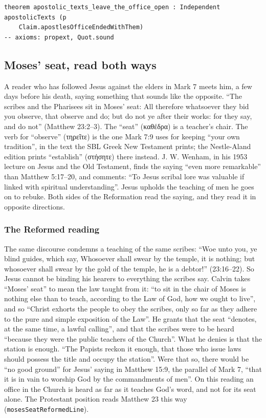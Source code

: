 \documentclass[11pt]{article}
\begin{document}
{\small\begin{verbatim}
theorem apostolic_texts_leave_the_office_open : Independent apostolicTexts (p
    Claim.apostlesOfficeEndedWithThem)
-- axioms: propext, Quot.sound
\end{verbatim}}
\subsection*{Moses’ seat, read both ways}
A reader who has followed Jesus against the elders in Mark 7 meets him, a few days before his death, saying something that sounds like the opposite. “The scribes and the Pharisees sit in Moses’ seat: All therefore whatsoever they bid you observe, that observe and do; but do not ye after their works: for they say, and do not” (Matthew 23:2–3). The “seat” (καθέδρα) is a teacher’s chair. The verb for “observe” (τηρεῖτε) is the one Mark 7:9 uses for keeping “your own tradition”, in the text the SBL Greek New Testament prints; the Nestle-Aland edition prints “establish” (στήσητε) there instead. J. W. Wenham, in his 1953 lecture on Jesus and the Old Testament, finds the saying “even more remarkable” than Matthew 5:17–20, and comments: “To Jesus scribal lore was valuable if linked with spiritual understanding”. Jesus upholds the teaching of men he goes on to rebuke. Both sides of the Reformation read the saying, and they read it in opposite directions.

\subsubsection*{The Reformed reading}
The same discourse condemns a teaching of the same scribes: “Woe unto you, ye blind guides, which say, Whosoever shall swear by the temple, it is nothing; but whosoever shall swear by the gold of the temple, he is a debtor!” (23:16–22). So Jesus cannot be binding his hearers to everything the scribes say. Calvin takes “Moses’ seat” to mean the law taught from it: “to sit in the chair of Moses is nothing else than to teach, according to the Law of God, how we ought to live”, and so “Christ exhorts the people to obey the scribes, only so far as they adhere to the pure and simple exposition of the Law”. He grants that the seat “denotes, at the same time, a lawful calling”, and that the scribes were to be heard “because they were the public teachers of the Church”. What he denies is that the station is enough. “The Papists reckon it enough, that those who issue laws should possess the title and occupy the station”. Were that so, there would be “no good ground” for Jesus’ saying in Matthew 15:9, the parallel of Mark 7, “that it is in vain to worship God by the commandments of men”. On this reading an office in the Church is heard as far as it teaches God’s word, and not for its seat alone. The Protestant position reads Matthew 23 this way (\texttt{moses\allowbreak{}Seat\allowbreak{}Reformed\allowbreak{}Line}).
\end{document}

